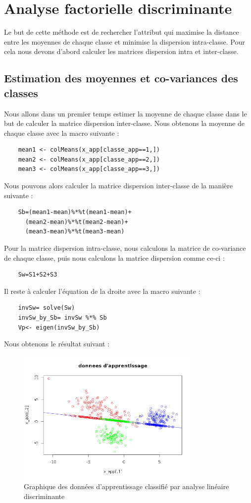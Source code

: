 \documentclass[a4paper,11pt]{article}
\begin{document}
  \section{Analyse factorielle discriminante}
  
  Le but de cette méthode est de rechercher l'attribut qui maximise la distance entre
  les moyennes de chaque classe et minimise la dispersion intra-classe. Pour cela nous
  devons d'abord calculer les matrices dispersion intra et inter-classe.
  
  \subsection{Estimation des moyennes et co-variances des classes}
  Nous allons dans un premier temps estimer la moyenne de chaque classe dans le but
  de calculer la matrice dispersion inter-classe. Nous obtenons la moyenne de chaque 
  classe avec la macro suivante : 
  
  \begin{lstlisting}
    mean1 <- colMeans(x_app[classe_app==1,])
    mean2 <- colMeans(x_app[classe_app==2,])
    mean3 <- colMeans(x_app[classe_app==3,])
  \end{lstlisting}

  Nous pouvons alors calculer la matrice dispersion inter-classe de la manière suivante :
  
  \begin{lstlisting}
    Sb=(mean1-mean)%*%t(mean1-mean)+
      (mean2-mean)%*%t(mean2-mean)+
      (mean3-mean)%*%t(mean3-mean)
  \end{lstlisting}
  
  Pour la matrice dispersion intra-classe, nous calculons la matrice de co-variance de chaque
  classe, puis nous calculons la matrice dispersion comme ce-ci : 
  
  \begin{lstlisting}
    Sw=S1+S2+S3
  \end{lstlisting}
  
  Il reste à calculer l'équation de la droite avec la macro suivante : 
  
  \begin{lstlisting}
    invSw= solve(Sw)
    invSw_by_Sb= invSw %*% Sb
    Vp<- eigen(invSw_by_Sb)
  \end{lstlisting}
  
  Nous obtenons le résultat suivant : 
  
  \begin{figure}[H]
  \center
   \includegraphics[width=9cm]{apprentissage_acp.png}
   \caption{Graphique des données d'apprentissage classifié par analyse linéaire discriminante}
  \end{figure}
  
\end{document}
